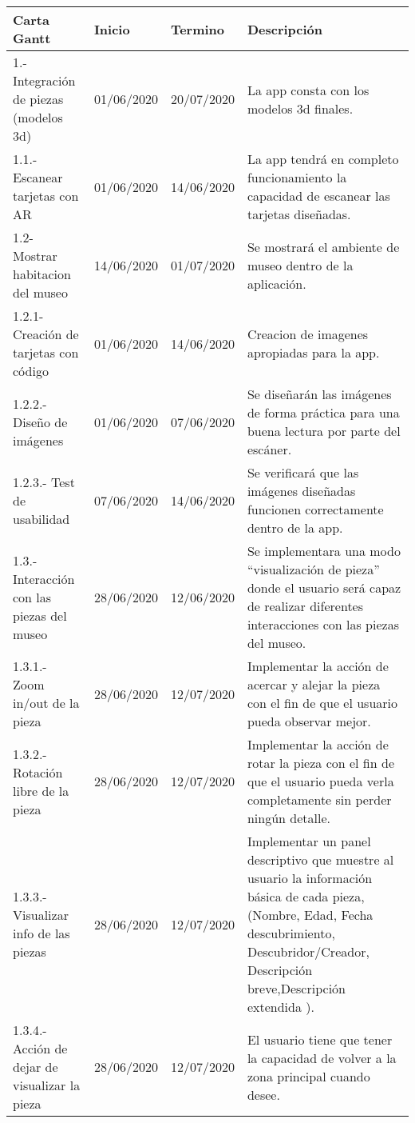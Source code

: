 \begin{longtable}{| p{}| p{}| p{}| p{}|}
\hline 
	Carta Gantt & 
	Inicio & 
	Termino	& 
	Descripción
\\ 
\hline 
	1.- Integración de piezas (modelos 3d) &
	01/06/2020 &
	20/07/2020 & 
	La app consta con los modelos 3d finales.
\\ 
\hline 
	1.1.- Escanear tarjetas con AR &
 	01/06/2020 & 
 	14/06/2020 & 
	La app tendrá en completo funcionamiento la capacidad de escanear las tarjetas diseñadas.
\\ 
\hline 
	1.2-  Mostrar habitacion del museo &
	14/06/2020 &
	01/07/2020 & 
	Se mostrará el ambiente de museo dentro de la aplicación.
	\\ 
\hline 
	1.2.1- Creación de tarjetas con código &
	01/06/2020 &
	14/06/2020 & 
	Creacion de imagenes apropiadas para la app.
	\\
\hline 
	1.2.2.- Diseño de imágenes &
	01/06/2020 &
	07/06/2020 &
	Se diseñarán las imágenes de forma práctica para una buena lectura por parte del escáner.
\\
\hline 
	1.2.3.- Test de usabilidad &
	07/06/2020 &
	14/06/2020 & 
	Se verificará que las imágenes diseñadas funcionen correctamente dentro de la app.
\\ 
\hline 
	1.3.- Interacción con las piezas del museo &
	28/06/2020 &
	12/06/2020 & 
	Se implementara una modo “visualización de pieza” donde el usuario será capaz de realizar diferentes interacciones con las piezas del museo.
\\
\hline 
	1.3.1.- Zoom in/out de la pieza &
	28/06/2020 &
	12/07/2020 & 
	Implementar la acción de acercar y alejar la pieza con el fin de que el usuario pueda observar mejor.
\\
\hline 
	1.3.2.- Rotación libre de la pieza &
	28/06/2020 &
	12/07/2020 & 
	Implementar la acción de rotar la pieza con el fin de que el usuario pueda verla completamente sin perder ningún detalle.
	\\
\hline 
	1.3.3.- Visualizar info de las piezas &
	28/06/2020 &
	12/07/2020 &
	Implementar un panel descriptivo que muestre al usuario la información básica de cada pieza, (Nombre, Edad, Fecha descubrimiento, Descubridor/Creador, Descripción breve,Descripción extendida ).
\\
\hline 
	1.3.4.- Acción de dejar de visualizar la pieza &
	28/06/2020 &
	12/07/2020 &
	El usuario tiene que tener la capacidad de volver a la zona principal cuando desee.
\\

\end{longtable}
